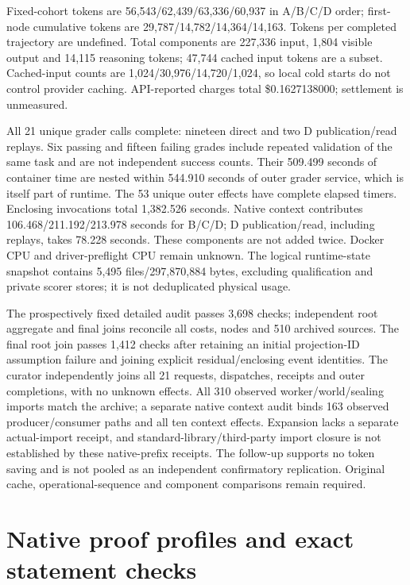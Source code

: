 Fixed-cohort tokens are 56,543/62,439/63,336/60,937 in A/B/C/D order; first-node
cumulative tokens are 29,787/14,782/14,364/14,163. Tokens per completed trajectory
are undefined. Total components are 227,336 input, 1,804 visible output and
14,115 reasoning tokens; 47,744 cached input tokens are a subset. Cached-input
counts are 1,024/30,976/14,720/1,024, so local cold starts do not control provider
caching. API-reported charges total \$0.1627138000; settlement is unmeasured.

All 21 unique grader calls complete: nineteen direct and two D publication/read
replays. Six passing and fifteen failing grades include repeated validation
of the same task and are not independent success counts. Their 509.499 seconds
of container time are nested within 544.910 seconds of outer grader service,
which is itself part of runtime. The 53 unique outer effects have complete
elapsed timers. Enclosing invocations total 1,382.526 seconds. Native context
contributes 106.468/211.192/213.978 seconds for B/C/D; D publication/read,
including replays, takes 78.228 seconds. These components are not added twice.
Docker CPU and driver-preflight CPU remain unknown. The logical runtime-state
snapshot contains 5,495 files/297,870,884 bytes, excluding qualification and
private scorer stores; it is not deduplicated physical usage.

The prospectively fixed detailed audit passes 3,698 checks; independent root
aggregate and final joins reconcile all costs, nodes and 510 archived sources.
The final root join passes 1,412 checks after retaining an initial projection-ID
assumption failure and joining explicit residual/enclosing event identities.
The curator independently joins all 21 requests, dispatches, receipts and outer
completions, with no unknown effects. All 310 observed worker/world/sealing
imports match the archive; a separate native context audit binds 163 observed
producer/consumer paths and all ten context effects. Expansion lacks a separate
actual-import receipt, and standard-library/third-party import closure is not
established by these native-prefix receipts. The follow-up supports no token
saving and is not pooled as an independent confirmatory replication. Original
cache, operational-sequence and component comparisons remain required.

\section{Native proof profiles and exact statement checks}
\label{sec:incremental-native-proof}
